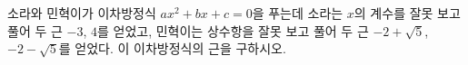 소라와 민혁이가 이차방정식 $ax^2+bx+c=0$을 푸는데 소라는 $x$의 계수를 잘못 보고 풀어 두 근 $-3$, $4$를 얻었고, 민혁이는 상수항을 잘못 보고 풀어 두 근 $-2+\sqrt{5}$, $-2-\sqrt{5}$를 얻었다. 이 이차방정식의 근을 구하시오.
